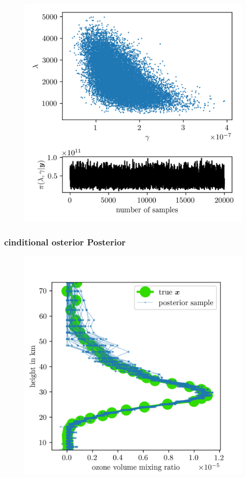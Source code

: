 \begin{figure}[ht!]
	\centering
	\includegraphics{ScatterplusHisto.png}
	\caption[]{}
	\label{fig:}
\end{figure}

\subsubsection{cinditional osterior Posterior}
\begin{figure}[ht!]
	\centering
	\includegraphics{FirstTestRes.png}
	\caption[]{}
	\label{fig:}
\end{figure}


